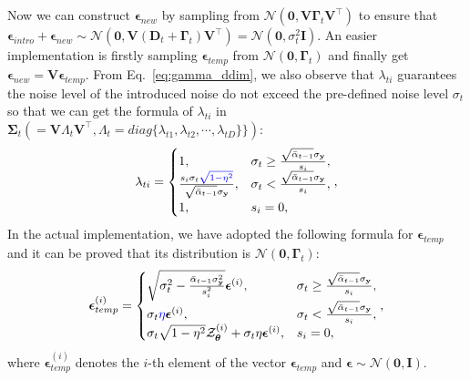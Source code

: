 \documentclass{article} \usepackage{iclr2023_conference,times}
\begin{document}
Now we can construct $\boldsymbol{\epsilon}_{new}$ by sampling from $\mathcal{N}(\mathbf{0}, \mathbf{V}\mathbf{\Gamma}_t\mathbf{V}^{\top})$ to ensure that $\boldsymbol{\epsilon}_{intro}+\boldsymbol{\epsilon}_{new}\sim\mathcal{N}(\mathbf{0}, \mathbf{V}(\mathbf{D}_t+\mathbf{\Gamma}_t)\mathbf{V}^{\top})=\mathcal{N}(\mathbf{0}, \sigma_t^2\mathbf{I})$. An easier implementation is firstly sampling $\boldsymbol{\epsilon}_{temp}$ from $\mathcal{N}(\mathbf{0}, \mathbf{\Gamma}_t)$ and finally get $\boldsymbol{\epsilon}_{new}=\mathbf{V}\boldsymbol{\epsilon}_{temp}.$ From Eq.~\ref{eq:gamma_ddim}, we also observe that $\lambda_{ti}$ guarantees the noise level of the introduced noise do not exceed the pre-defined noise level $\sigma_{t}$ so that we can get the formula of $\lambda_{ti}$ in $\mathbf{\Sigma}_t(=\mathbf{V}\Lambda_{t}\mathbf{V}^{\top}, \Lambda_{t}=diag\{\lambda_{t1}, \lambda_{t2}, \cdots, \lambda_{tD}\}\})$:
\begin{equation}
    \lambda_{ti}=\begin{cases}
        1, & \sigma_{t} \ge \frac{\sqrt{\bar{\alpha}_{t-1}}\sigma_{\mathbf{y}}}{s_i}, \\
        \frac{s_i\sigma_{t}\textcolor{blue}{\sqrt{1-\eta^2}}}{\sqrt{\bar{\alpha}_{t-1}}\sigma_{\mathbf{y}}}, & \sigma_{t} < \frac{\sqrt{\bar{\alpha}_{t-1}}\sigma_{\mathbf{y}}}{s_i}, \\
        1, & s_i = 0,
    \end{cases},
\end{equation}
In the actual implementation, we have adopted the following formula for $\boldsymbol{\epsilon}_{temp}$ and it can be proved that its distribution is $\mathcal{N}(\mathbf{0}, \mathbf{\Gamma}_t)$:
\begin{equation}
    \boldsymbol{\epsilon}_{temp}^{(i)}=\begin{cases}
        \sqrt{\sigma_{t}^2-\frac{\bar{\alpha}_{t-1}\sigma_{\mathbf{y}}^2}{s_i^2}}\boldsymbol{\epsilon}^{(i)}, & \sigma_{t} \ge \frac{\sqrt{\bar{\alpha}_{t-1}}\sigma_{\mathbf{y}}}{s_i}, \\
        \sigma_{t}\textcolor{blue}{\eta}\boldsymbol{\epsilon}^{(i)}, & \sigma_{t} < \frac{\sqrt{\bar{\alpha}_{t-1}}\sigma_{\mathbf{y}}}{s_i}, \\
        \sigma_{t}\sqrt{1-\eta^2}\mathcal{Z}_{\boldsymbol{\theta}}^{(i)} + \sigma_{t}\eta\boldsymbol{\epsilon}^{(i)}, & s_i = 0,
    \end{cases},
\end{equation}
where $\boldsymbol{\epsilon}_{temp}^{(i)}$ denotes the $i$-th element of the vector $\boldsymbol{\epsilon}_{temp}$ and $\boldsymbol{\epsilon}\sim\mathcal{N}(\mathbf{0}, \mathbf{I})$.
\end{document}
